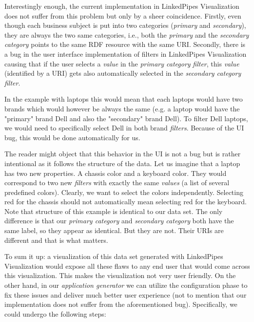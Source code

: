 Interestingly enough, the current implementation in LinkedPipes Visualization does not suffer from this problem but only by a sheer coincidence. Firstly, even though each business subject is put into two categories (\emph{primary} and \emph{secondary}), they are always the two same categories, i.e., both the \emph{primary} and the \emph{secondary category} points to the same RDF resource with the same URI. Secondly, there is a bug in the  user interface implementation of filters in LinkedPipes Visualization causing that if the user selects a \emph{value} in the \emph{primary category} \emph{filter}, this \emph{value} (identified by a URI) gets also automatically selected in the \emph{secondary category} \emph{filter}.

In the example with laptops this would mean that each laptops would have two brands which would however be always the same (e.g. a laptop would have the "primary" brand Dell and also the "secondary" brand Dell). To filter Dell laptops, we would need to specifically select Dell in both brand \emph{filters}. Because of the UI bug, this would be done automatically for us.

The reader might object that this behavior in the UI is not a bug but is rather intentional as it follows the structure of the data. Let us imagine that a laptop has two new properties. A chassis color and a keyboard color. They would correspond to two new \emph{filters} with exactly the same \emph{values} (a list of several predefined colors). Clearly, we want to select the colors independently. Selecting red for the chassis should not automatically mean selecting red for the keyboard. Note that structure of this example is identical to our data set. The only difference is that our \emph{primary category} and \emph{secondary category} both have the same label, so they appear as identical. But they are not. Their URIs are different and that is what matters.

To sum it up: a visualization of this data set generated with LinkedPipes Visualization would expose all these flaws to any end user that would come across this visualization. This makes the visualization not very user friendly. On the other hand, in our \emph{application generator} we can utilize the configuration phase to fix these issues and deliver much better user experience (not to mention that our implementation does not suffer from the aforementioned bug). Specifically, we could undergo the following steps:

